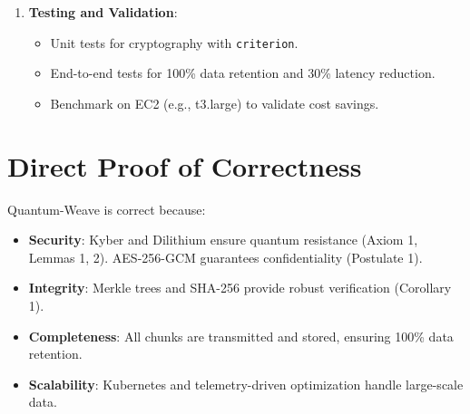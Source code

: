\documentclass[12pt]{article}
\begin{document}
\begin{enumerate}
        \begin{itemize}
            \item Integrate AWS SDK for EC2 telemetry.
            \item Dynamically adjust \( b \) based on real-time metrics.
        \end{itemize}
    \item \textbf{Testing and Validation}:
        \begin{itemize}
            \item Unit tests for cryptography with \texttt{criterion}.
            \item End-to-end tests for 100\% data retention and 30\% latency reduction.
            \item Benchmark on EC2 (e.g., t3.large) to validate cost savings.
        \end{itemize}
\end{enumerate}

\section{Direct Proof of Correctness}
Quantum-Weave is correct because:
\begin{itemize}
    \item \textbf{Security}: Kyber and Dilithium ensure quantum resistance (Axiom 1, Lemmas 1, 2). AES-256-GCM guarantees confidentiality (Postulate 1).
    \item \textbf{Integrity}: Merkle trees and SHA-256 provide robust verification (Corollary 1).
    \item \textbf{Completeness}: All chunks are transmitted and stored, ensuring 100\% data retention.
    \item \textbf{Scalability}: Kubernetes and telemetry-driven optimization handle large-scale data.
\end{itemize}
\end{document}
